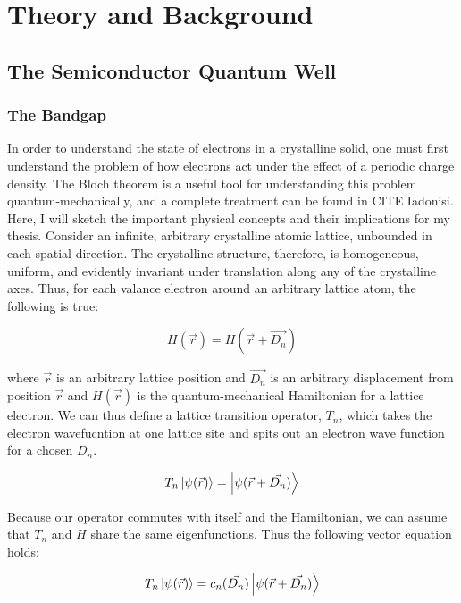 \chapter{Theory and Background}

\section{The Semiconductor Quantum Well}
\subsection{The Bandgap}
\indent In order to understand the state of electrons in a crystalline solid, one must first understand the problem of how electrons act under the effect of a periodic charge density. The Bloch theorem is a useful tool for understanding this problem quantum-mechanically, and a complete treatment can be found in CITE Iadonisi. Here, I will sketch the important physical concepts and their implications for my thesis. Consider an infinite, arbitrary crystalline atomic lattice, unbounded in each spatial direction. The crystalline structure, therefore, is homogeneous, uniform, and evidently invariant under translation along any of the crystalline axes. Thus, for each valance electron around an arbitrary lattice atom, the following is true:

\begin{equation}
H(\vec{r}) = H(\vec{r} + \vec{D_n})
\end{equation}

where $\vec{r}$ is an arbitrary lattice position and $\vec{D_n}$ is an arbitrary displacement from position $\vec{r}$ and $H(\vec{r})$ is the quantum-mechanical Hamiltonian for a lattice electron. We can thus define a lattice transition operator, $T_n$, which takes the electron wavefucntion at one lattice site and spits out an electron wave function for a chosen $D_n$.

\begin{equation}
T_n \ket{\psi(\vec{r})}=\ket{ \psi(\vec{r} + \vec{D_n})}
\end{equation}

Because our operator commutes with itself and the Hamiltonian, we can assume that $T_n$ and $H$ share the same eigenfunctions. Thus the following vector equation holds:

\begin{equation}
T_n\ket{\psi(\vec{r})} = c_n(\vec{D_n})\ket{\psi(\vec{r} + \vec{D_n})}
\end{equation}

